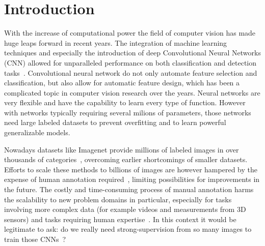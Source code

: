%

% 

\chapter{Introduction}
With the increase of computational power the field of computer vision has made huge leaps forward in recent years. The integration of machine learning techniques and especially the introduction of deep Convolutional Neural Networks (CNN) allowed for unparalleled performance on both classification and detection tasks~\cite{krizhevsky2012}. Convolutional neural network do not only automate feature selection and classification, but also allow for automatic feature design, which has been a complicated topic in computer vision research over the years. Neural networks are very flexible and have the capability to learn every type of function. However with networks typically requiring several milions of parameters, those networks need large labeled datasets to prevent overfitting and to learn powerful generalizable models.

Nowadays datasets like Imagenet provide millions of labeled images in over thousands of categories~\cite{deng2009}, overcoming earlier shortcomings of smaller datasets. Efforts to scale these methods to billions of images are however hampered by the expense of human annotation required~\cite{doersch2015}, limiting possibilities for improvements in the future. The costly and time-consuming process of manual annotation harms the scalability to new problem domains in particular, especially for tasks involving more complex data (for example videos and measurements from 3D sensors) and tasks requiring human expertise~\cite{lee2017,fernando2017}. In this context it would be legitimate to ask: do we really need strong-supervision from so many images to train those CNNs~\cite{wang2015}?


